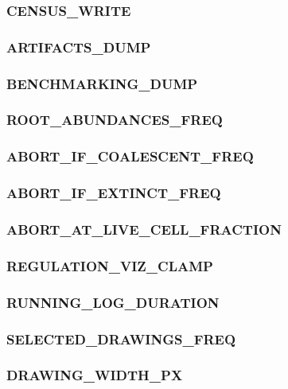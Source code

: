 \subsubsection{CENSUS\_WRITE}

\subsubsection{ARTIFACTS\_DUMP}

\subsubsection{BENCHMARKING\_DUMP}

\subsubsection{ROOT\_ABUNDANCES\_FREQ}

\subsubsection{ABORT\_IF\_COALESCENT\_FREQ}

\subsubsection{ABORT\_IF\_EXTINCT\_FREQ}

\subsubsection{ABORT\_AT\_LIVE\_CELL\_FRACTION}

\subsubsection{REGULATION\_VIZ\_CLAMP}

\subsubsection{RUNNING\_LOG\_DURATION}

\subsubsection{SELECTED\_DRAWINGS\_FREQ}

\subsubsection{DRAWING\_WIDTH\_PX}

